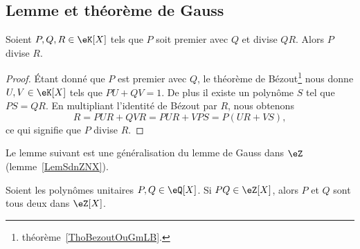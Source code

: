 \subsection{Lemme et théorème de Gauss}

\begin{theorem}  \label{ThoLLgIsig}
	Soient \( P,Q,R\in \eK[X]\) tels que \( P\) soit premier avec \( Q\) et divise \( QR\). Alors \( P\) divise \( R\).
\end{theorem}

\begin{proof}
	Étant donné que \( P\) est premier avec \( Q\), le théorème de Bézout\footnote{théorème~\ref{ThoBezoutOuGmLB}.} nous donne \( U,V\in \eK[X]\) tels que \( PU+QV=1\). De plus il existe un polynôme \( S\) tel que \( PS=QR\). En multipliant l'identité de Bézout par \( R\), nous obtenons
	\begin{equation}
		R=PUR+QVR=PUR+VPS=P(UR+VS),
	\end{equation}
	ce qui signifie que \( P\) divise \( R\).
\end{proof}

Le lemme suivant est une généralisation du lemme de Gauss dans \( \eZ\) (lemme~\ref{LemSdnZNX}).
\begin{lemma}       \label{LemEfdkZw}   
	Soient les polynômes unitaires \( P,Q\in \eQ[X]\). Si \( PQ\in\eZ[X]\), alors \( P\) et \( Q\) sont tous deux dans \( \eZ[X]\).
\end{lemma}

